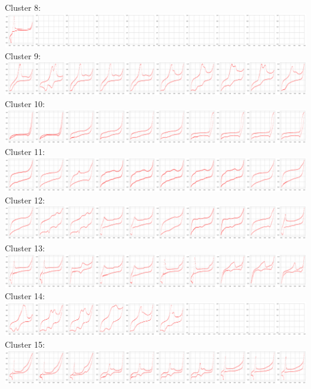 Cluster 8:\\
\includegraphics[width=1.0\textwidth]{figures/clusters/cv_cluster8.png}
Cluster 9:\\
\includegraphics[width=1.0\textwidth]{figures/clusters/cv_cluster9.png}
Cluster 10:\\
\includegraphics[width=1.0\textwidth]{figures/clusters/cv_cluster10.png}
Cluster 11:\\
\includegraphics[width=1.0\textwidth]{figures/clusters/cv_cluster11.png}
Cluster 12:\\
\includegraphics[width=1.0\textwidth]{figures/clusters/cv_cluster12.png}
Cluster 13:\\
\includegraphics[width=1.0\textwidth]{figures/clusters/cv_cluster13.png}
Cluster 14:\\
\includegraphics[width=1.0\textwidth]{figures/clusters/cv_cluster14.png}
Cluster 15:\\
\includegraphics[width=1.0\textwidth]{figures/clusters/cv_cluster15.png}
